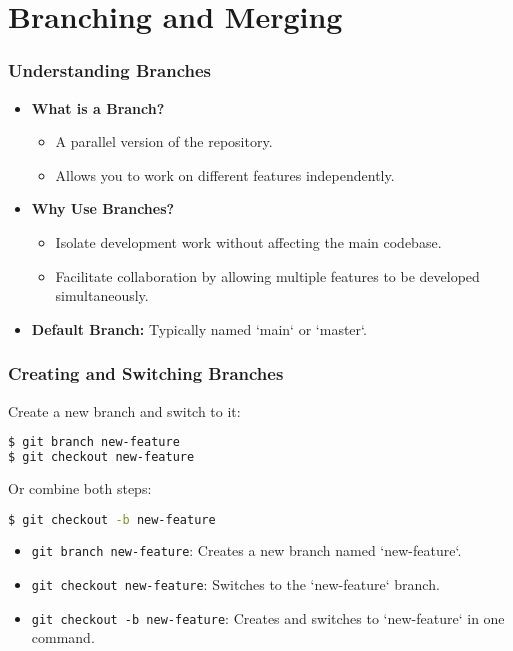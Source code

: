 \section{Branching and Merging}

\begin{frame}
  \frametitle{Understanding Branches}
  \begin{itemize}
    \item \textbf{What is a Branch?}
      \begin{itemize}
        \item A parallel version of the repository.
        \item Allows you to work on different features independently.
      \end{itemize}
    \item \textbf{Why Use Branches?}
      \begin{itemize}
        \item Isolate development work without affecting the main codebase.
        \item Facilitate collaboration by allowing multiple features to be developed simultaneously.
      \end{itemize}
    \item \textbf{Default Branch:} Typically named `main` or `master`.
  \end{itemize}
\end{frame}

\begin{frame}[fragile]
  \frametitle{Creating and Switching Branches}
  Create a new branch and switch to it:
  \begin{lstlisting}[language=bash]
$ git branch new-feature
$ git checkout new-feature
  \end{lstlisting}
  Or combine both steps:
  \begin{lstlisting}[language=bash]
$ git checkout -b new-feature
  \end{lstlisting}
  \begin{itemize}
    \item \texttt{git branch new-feature}: Creates a new branch named `new-feature`.
    \item \texttt{git checkout new-feature}: Switches to the `new-feature` branch.
    \item \texttt{git checkout -b new-feature}: Creates and switches to `new-feature` in one command.
  \end{itemize}
\end{frame}

